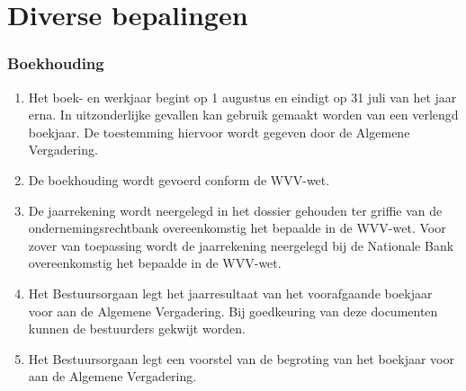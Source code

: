 \part{Diverse bepalingen}

    
    \section{Boekhouding}
    \begin{enumerate}
    \item Het boek- en werkjaar begint op 1 augustus en eindigt op 31 juli van het jaar erna. In uitzonderlijke gevallen kan gebruik gemaakt worden van een verlengd boekjaar. De toestemming hiervoor wordt gegeven door de Algemene Vergadering.
    \item De boekhouding wordt gevoerd conform de WVV-wet.
    \item De jaarrekening wordt neergelegd in het dossier gehouden ter griffie van de ondernemingsrechtbank overeenkomstig het bepaalde in de WVV-wet. Voor zover van toepassing wordt de jaarrekening neergelegd bij de Nationale Bank overeenkomstig het bepaalde in de WVV-wet.
    \item Het Bestuursorgaan legt het jaarresultaat van het voorafgaande boekjaar voor aan de Algemene Vergadering. Bij goedkeuring van deze documenten kunnen de bestuurders gekwijt worden.
    \item Het Bestuursorgaan legt een voorstel van de begroting van het boekjaar voor aan de Algemene Vergadering. 
    \end{enumerate}
    
